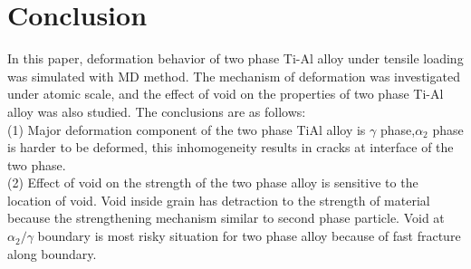 \documentclass[materials,article,submit,moreauthors,pdftex,10pt,a4paper]{Definitions/mdpi}
\begin{document}
\section{Conclusion}
In this paper, deformation behavior of two phase Ti-Al alloy under tensile loading was simulated with MD method. The mechanism of deformation was investigated under atomic scale, and the effect of void on the properties of two phase Ti-Al alloy was also studied.  The conclusions are as follows:\\
(1) Major deformation component of the two phase TiAl alloy is $\gamma$ phase,$\alpha_2$ phase is harder to be deformed, this inhomogeneity results in cracks at interface of the two phase. \\
(2) Effect of  void on the strength of the two phase alloy is sensitive to the location of  void. Void inside grain has detraction to the strength of material because the strengthening mechanism similar to second phase particle. Void at $\alpha_2 / \gamma$ boundary is most risky situation for two phase alloy because of fast fracture along boundary.


\end{document}
